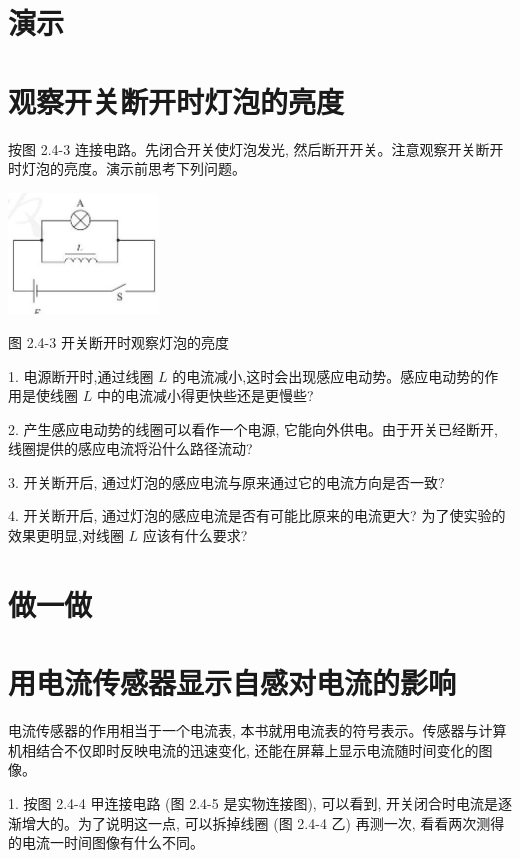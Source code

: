 \documentclass[10pt]{article}
\begin{document}
\section*{演示}

\section*{观察开关断开时灯泡的亮度}

按图 2.4-3 连接电路。先闭合开关使灯泡发光, 然后断开开关。注意观察开关断开时灯泡的亮度。演示前思考下列问题。

\begin{center}
\includegraphics[max width=0.3\textwidth]{images/01910e72-c5b7-7ed5-a6d4-fb3a5faefc32_46_540699.jpg}
\end{center}

图 2.4-3 开关断开时观察灯泡的亮度

1. 电源断开时,通过线圈 \(L\) 的电流减小,这时会出现感应电动势。感应电动势的作用是使线圈 \(L\) 中的电流减小得更快些还是更慢些?

2. 产生感应电动势的线圈可以看作一个电源, 它能向外供电。由于开关已经断开, 线圈提供的感应电流将沿什么路径流动?

3. 开关断开后, 通过灯泡的感应电流与原来通过它的电流方向是否一致?

4. 开关断开后, 通过灯泡的感应电流是否有可能比原来的电流更大? 为了使实验的效果更明显,对线圈 \(L\) 应该有什么要求?

\section*{做一做}

\section*{用电流传感器显示自感对电流的影响}

电流传感器的作用相当于一个电流表, 本书就用电流表的符号表示。传感器与计算机相结合不仅即时反映电流的迅速变化, 还能在屏幕上显示电流随时间变化的图像。

1. 按图 2.4-4 甲连接电路 (图 2.4-5 是实物连接图), 可以看到, 开关闭合时电流是逐渐增大的。为了说明这一点, 可以拆掉线圈 (图 2.4-4 乙) 再测一次, 看看两次测得的电流一时间图像有什么不同。
\end{document}
